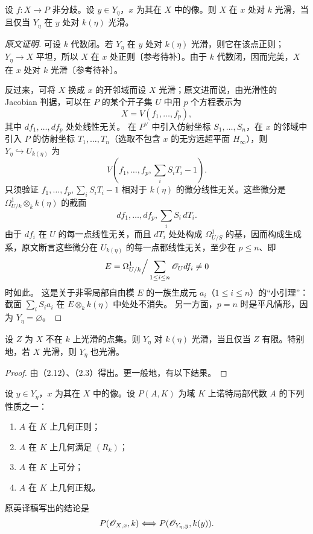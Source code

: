 设 $f:X\to P$ 非分歧。设 $y\in Y_\eta$，$x$ 为其在 $X$ 中的像。则 $X$ 在 $x$ 处对 $k$ 光滑，当且仅当 $Y_\eta$ 在 $y$ 处对 $k(\eta)$ 光滑。
\begin{proof}[原文证明]
可设 $k$ 代数闭。若 $Y_\eta$ 在 $y$ 处对 $k(\eta)$ 光滑，则它在该点正则；$Y_\eta\to X$ 平坦，所以 $X$ 在 $x$ 处正则〔参考待补〕。由于 $k$ 代数闭，因而完美，$X$ 在 $x$ 处对 $k$ 光滑〔参考待补〕。

反过来，可将 $X$ 换成 $x$ 的开邻域而设 $X$ 光滑；原文进而说，由光滑性的 Jacobian 判据，可以在 $P$ 的某个开子集 $U$ 中用 $p$ 个方程表示为
\[
 X=V(f_1,\ldots,f_p),
\]
其中 $df_1,\ldots,df_p$ 处处线性无关。
在 $P^\vee$ 中引入仿射坐标 $S_1,\ldots,S_n$，在 $x$ 的邻域中引入 $P$ 的仿射坐标 $T_1,\ldots,T_n$（选取不包含 $x$ 的无穷远超平面 $H_\infty$），则 $Y_\eta\hookrightarrow U_{k(\eta)}$ 为
\[
 V\left(f_1,\ldots,f_p,\sum_iS_iT_i-1\right).
\]
只须验证 $f_1,\ldots,f_p,\sum_iS_iT_i-1$ 相对于 $k(\eta)$ 的微分线性无关。这些微分是 $\Omega^1_{U/k}\otimes_kk(\eta)$ 的截面
\[
 df_1,\ldots,df_p,\sum_iS_i\,dT_i.
\]
由于 $df_i$ 在 $U$ 的每一点线性无关，而且 $dT_i$ 处处构成 $\Omega^1_{U/S}$ 的基，因而构成生成系，原文断言这些微分在 $U_{k(\eta)}$ 的每一点都线性无关，至少在 $p\leq n$、即
\[
 E=\Omega^1_{U/k}\Big/\sum_{1\leq i\leq n}\mathscr O_Udf_i\ne0
\]
时如此。
这是关于非零局部自由模 $E$ 的一族生成元 $a_i$（$1\leq i\leq n$）的“小引理”：截面 $\sum_iS_ia_i$ 在 $E\otimes_kk(\eta)$ 中处处不消失。
另一方面，$p=n$ 时是平凡情形，因为 $Y_\eta=\varnothing$。
\end{proof}

设 $Z$ 为 $X$ 不在 $k$ 上光滑的点集。则 $Y_\eta$ 对 $k(\eta)$ 光滑，当且仅当 $Z$ 有限。特别地，若 $X$ 光滑，则 $Y_\eta$ 也光滑。
\begin{proof}
由（2.12）、（2.3）得出。更一般地，有以下结果。
\end{proof}

设 $y\in Y_\eta$，$x$ 为其在 $X$ 中的像。设 $P(A,K)$ 为域 $K$ 上诺特局部代数 $A$ 的下列性质之一：
\begin{enumerate}[label=(\roman*)]
\item $A$ 在 $K$ 上几何正则；
\item $A$ 在 $K$ 上几何满足 $(R_k)$；
\item $A$ 在 $K$ 上可分；
\item $A$ 在 $K$ 上几何正规。
\end{enumerate}
原英译稿写出的结论是
\[
 P(\mathscr O_{X,x},k)\Longleftrightarrow P(\mathscr O_{Y_\eta,y},k(y)).
\]


